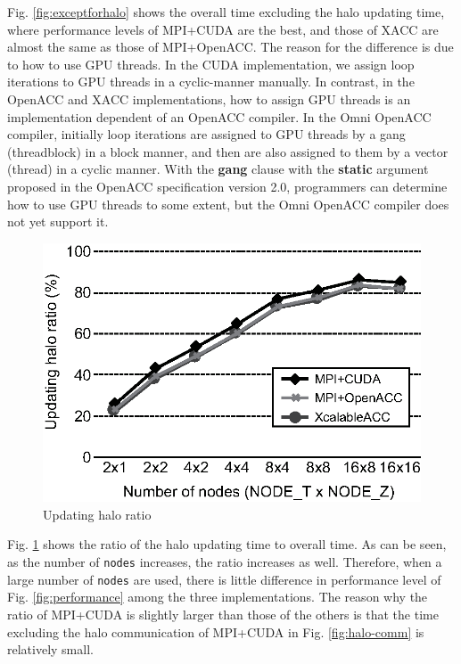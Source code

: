 Fig. \ref{fig:exceptforhalo} shows the overall time excluding the halo updating time,
where performance levels of MPI+CUDA are the best, and those of XACC are almost the same as those of MPI+OpenACC.
The reason for the difference is due to how to use GPU threads.
In the CUDA implementation,
we assign loop iterations to GPU threads in a cyclic-manner manually.
In contrast, in the OpenACC and XACC implementations,
how to assign GPU threads is an implementation dependent of an OpenACC compiler.
In the Omni OpenACC compiler,
initially loop iterations are assigned to GPU threads by a gang (threadblock) in a block manner,
and then are also assigned to them by a vector (thread) in a cyclic manner.
With the {\bf gang} clause with the {\bf static} argument proposed in the OpenACC specification version 2.0,
programmers can determine how to use GPU threads to some extent,
but the Omni OpenACC compiler does not yet support it.

\begin{figure}[h]
\centering
\includegraphics[scale=0.58,clip]{figs/exceptforhalo-per.eps}
\caption{Updating halo ratio} \label{fig:exceptforhalo-per}
\end{figure}

Fig. \ref{fig:exceptforhalo-per} shows the ratio of the halo updating time to overall time.
As can be seen,
as the number of {\tt nodes} increases, the ratio increases as well.
Therefore,
when a large number of {\tt nodes} are used,
there is little difference in performance level of Fig. \ref{fig:performance} among the three implementations.
The reason why the ratio of MPI+CUDA is slightly larger than those of the others is that
the time excluding the halo communication of MPI+CUDA in Fig. \ref{fig:halo-comm} is relatively small.

